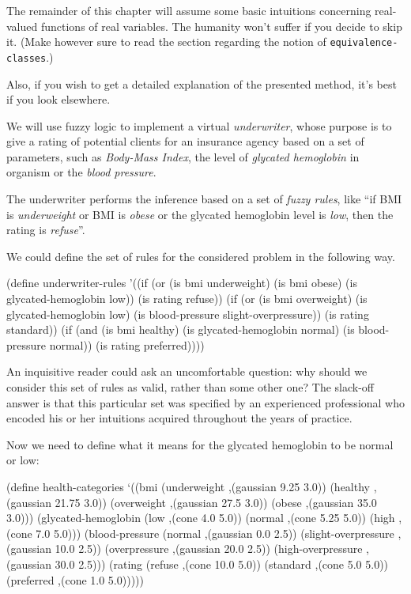 The remainder of this chapter will assume some basic
intuitions concerning real-valued functions of real variables.
The humanity won't suffer if you decide to skip it. (Make
however sure to read the section regarding the notion of 
\texttt{equivalence-classes}.)

Also, if you wish to get a detailed explanation of the presented
method, it's best if you look elsewhere.

We will use fuzzy logic to implement a virtual 
\textit{underwriter}, whose purpose is to give
a rating of potential clients for an insurance agency
based on a set of parameters, such as \textit{Body-Mass Index},
the level of \textit{glycated hemoglobin} in organism
or the \textit{blood pressure}.

The underwriter performs the inference based on a set
of \textit{fuzzy rules}, like ``if BMI is \textit{underweight}
or BMI is \textit{obese} or the glycated hemoglobin level is
\textit{low}, then the rating is \textit{refuse}''.

We could define the set of rules for the considered problem
in the following way.

\begin{Snippet}
(define underwriter-rules
  '((if (or (is bmi underweight) (is bmi obese)
            (is glycated-hemoglobin low))
	(is rating refuse))
    (if (or (is bmi overweight) (is glycated-hemoglobin low)
	    (is blood-pressure slight-overpressure))
	(is rating standard))
    (if (and (is bmi healthy) (is glycated-hemoglobin normal)
	     (is blood-pressure normal))
	(is rating preferred))))
\end{Snippet}

An inquisitive reader could ask an uncomfortable question:
why should we consider this set of rules as valid, rather
than some other one? The slack-off answer is that this
particular set was specified by an experienced professional
who encoded his or her intuitions acquired throughout the
years of practice.

Now we need to define what it means for the glycated hemoglobin
to be normal or low:

\begin{Snippet}
(define health-categories
  `((bmi (underweight ,(gaussian 9.25 3.0))
	 (healthy ,(gaussian 21.75 3.0))
	 (overweight ,(gaussian 27.5 3.0))
	 (obese ,(gaussian 35.0 3.0)))
    (glycated-hemoglobin (low ,(cone 4.0 5.0))
			 (normal ,(cone 5.25 5.0))
			 (high ,(cone 7.0 5.0)))
    (blood-pressure (normal ,(gaussian 0.0 2.5))
		    (slight-overpressure ,(gaussian 10.0 2.5))
		    (overpressure ,(gaussian 20.0 2.5))
		    (high-overpressure ,(gaussian 30.0 2.5)))
    (rating (refuse ,(cone 10.0 5.0))
	    (standard ,(cone 5.0 5.0))
	    (preferred ,(cone 1.0 5.0)))))
\end{Snippet}

